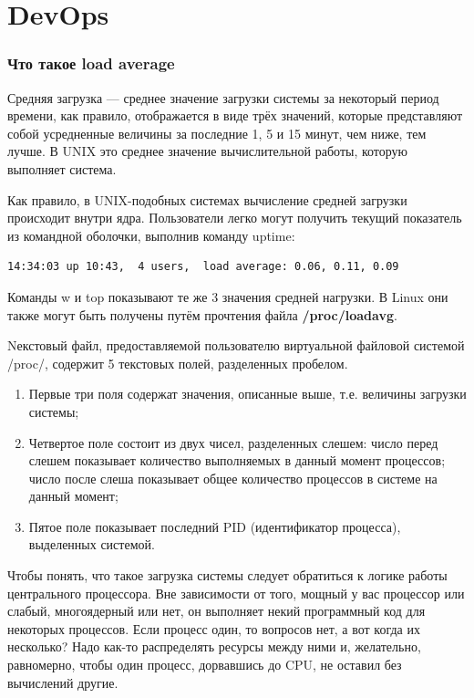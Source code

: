 \part{DevOps}

\section{Что такое load average}
Средняя загрузка — среднее значение загрузки системы за некоторый период времени, как правило, отображается в виде трёх значений, которые представляют собой усредненные величины за последние 1, 5 и 15 минут, чем ниже, тем лучше. В UNIX это среднее значение вычислительной работы, которую выполняет система.

Как правило, в UNIX-подобных системах вычисление средней загрузки происходит внутри ядра. Пользователи легко могут получить текущий показатель из командной оболочки, выполнив команду uptime: 

\begin{lstlisting}
14:34:03 up 10:43,  4 users,  load average: 0.06, 0.11, 0.09
\end{lstlisting}

Команды w и top показывают те же 3 значения средней нагрузки. В Linux они также могут быть получены путём прочтения файла \textbf{/proc/loadavg}. 

Nекстовый файл, предоставляемой пользователю виртуальной файловой системой /proc/, содержит 5 текстовых полей, разделенных пробелом. 
\begin{enumerate}
\item Первые три поля содержат значения, описанные выше, т.е. величины загрузки системы;
\item Четвертое поле состоит из двух чисел, разделенных слешем: число перед слешем показывает количество выполняемых в данный момент процессов; число после слеша показывает общее количество процессов в системе на данный момент;
\item Пятое поле показывает последний PID (идентификатор процесса), выделенных системой. 
\end{enumerate}

Чтобы понять, что такое загрузка системы следует обратиться к логике работы центрального процессора. Вне зависимости от того, мощный у вас процессор или слабый, многоядерный или нет, он выполняет некий программный код для некоторых процессов. Если процесс один, то вопросов нет, а вот когда их несколько? Надо как-то распределять ресурсы между ними и, желательно, равномерно, чтобы один процесс, дорвавшись до CPU, не оставил без вычислений другие.

